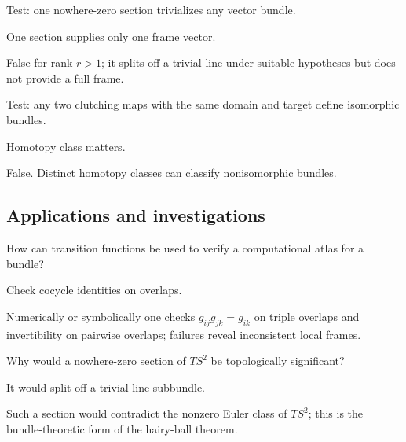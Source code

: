 \begin{exercise}\label{exr:viii30-ped-11}
Test: one nowhere-zero section trivializes any vector bundle.
\end{exercise}
\begin{hint}
One section supplies only one frame vector.
\end{hint}
\begin{solution}
False for rank $r>1$; it splits off a trivial line under suitable hypotheses but does not provide a full frame.
\end{solution}

\begin{exercise}\label{exr:viii30-ped-12}
Test: any two clutching maps with the same domain and target define isomorphic bundles.
\end{exercise}
\begin{hint}
Homotopy class matters.
\end{hint}
\begin{solution}
False. Distinct homotopy classes can classify nonisomorphic bundles.
\end{solution}

\subsection*{Applications and investigations}

\begin{exercise}\label{exr:viii30-ped-13}
How can transition functions be used to verify a computational atlas for a bundle?
\end{exercise}
\begin{hint}
Check cocycle identities on overlaps.
\end{hint}
\begin{solution}
Numerically or symbolically one checks $g_{ij}g_{jk}=g_{ik}$ on triple overlaps and invertibility on pairwise overlaps; failures reveal inconsistent local frames.
\end{solution}

\begin{exercise}\label{exr:viii30-ped-14}
Why would a nowhere-zero section of $TS^2$ be topologically significant?
\end{exercise}
\begin{hint}
It would split off a trivial line subbundle.
\end{hint}
\begin{solution}
Such a section would contradict the nonzero Euler class of $TS^2$; this is the bundle-theoretic form of the hairy-ball theorem.
\end{solution}


